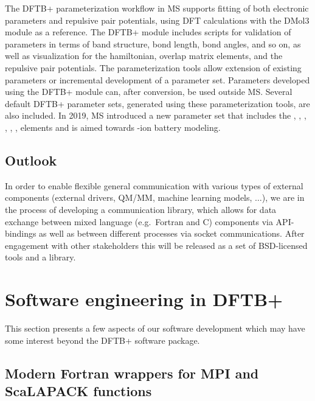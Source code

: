 \documentclass{revtex4-1}
\newcommand{\dftbp}{DFTB+}
\begin{document}
The \dftbp{} parameterization workflow in MS supports fitting of both electronic
parameters and repulsive pair potentials, using DFT calculations with the DMol3
module \cite{Delley1,Delley2} as a reference. The \dftbp{} module includes
scripts for validation of parameters in terms of band structure, bond length,
bond angles, and so on, as well as visualization for the hamiltonian, overlap
matrix elements, and the repulsive pair potentials. The parameterization tools
allow extension of existing parameters or incremental development of a parameter
set. Parameters developed using the \dftbp{} module can, after conversion, be used
outside MS. Several default \dftbp{} parameter sets, generated using
these parameterization tools, are also included. In 2019, MS introduced a new parameter set that
includes the , , , , , ,  elements
and is aimed towards -ion battery modeling.


\subsection{Outlook}

In order to enable flexible general communication with various types of external
components (external drivers, QM/MM, machine learning models, $\ldots$), we are
in the process of developing a communication library,\cite{saydx-repo} which
allows for data exchange between mixed language (e.g.\ Fortran and C) components
via API-bindings as well as between different processes via socket
communications. After engagement with other stakeholders this will be released
as a set of BSD-licensed tools and a library.


\section{Software engineering in \dftbp{}}

This section presents a few aspects of our software development which may have
some interest beyond the \dftbp{} software package.


\subsection{Modern Fortran wrappers for MPI and ScaLAPACK functions}
\end{document}
